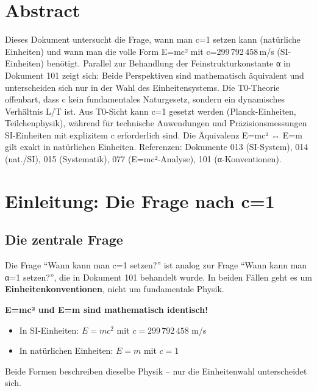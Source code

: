 \section*{Abstract}
		Dieses Dokument untersucht die Frage, wann man c=1 setzen kann (natürliche Einheiten) und wann man die volle Form E=mc² mit c=299\,792\,458\,m/s (SI-Einheiten) benötigt. Parallel zur Behandlung der Feinstrukturkonstante α in Dokument 101 zeigt sich: Beide Perspektiven sind mathematisch äquivalent und unterscheiden sich nur in der Wahl des Einheitensystems. Die T0-Theorie offenbart, dass c kein fundamentales Naturgesetz, sondern ein dynamisches Verhältnis L/T ist. Aus T0-Sicht kann c=1 gesetzt werden (Planck-Einheiten, Teilchenphysik), während für technische Anwendungen und Präzisionsmessungen SI-Einheiten mit explizitem c erforderlich sind. Die Äquivalenz E=mc² ↔ E=m gilt exakt in natürlichen Einheiten. Referenzen: Dokumente 013 (SI-System), 014 (nat./SI), 015 (Systematik), 077 (E=mc²-Analyse), 101 (α-Konventionen).

	
	
	
	\section{Einleitung: Die Frage nach c=1}
	
	\subsection{Die zentrale Frage}
	
	Die Frage ``Wann kann man c=1 setzen?'' ist analog zur Frage ``Wann kann man α=1 setzen?'', die in Dokument 101 behandelt wurde. In beiden Fällen geht es um \textbf{Einheitenkonventionen}, nicht um fundamentale Physik.
	
	\begin{tcolorbox}[colback=blue!5!white,colframe=blue!75!black,title=Zentrale These]
		\textbf{E=mc² und E=m sind mathematisch identisch!}
		
		\begin{itemize}
			\item In SI-Einheiten: $E = mc^2$ mit $c = 299\,792\,458$ m/s
			\item In natürlichen Einheiten: $E = m$ mit $c = 1$
		\end{itemize}
		
		Beide Formen beschreiben dieselbe Physik -- nur die Einheitenwahl unterscheidet sich.
	\end{tcolorbox}
	
